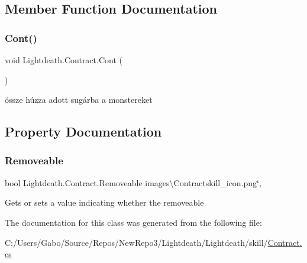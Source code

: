 \subsection{Member Function Documentation}
\hypertarget{class_lightdeath_1_1_contract_a87abee8cbc76b631f7a29c1adc583cc8}{}\label{class_lightdeath_1_1_contract_a87abee8cbc76b631f7a29c1adc583cc8} 
\subsubsection{\texorpdfstring{Cont()}{Cont()}}
{\footnotesize\ttfamily void Lightdeath.\+Contract.\+Cont (\begin{DoxyParamCaption}{ }\end{DoxyParamCaption})\hspace{0.3cm}{\ttfamily [inline]}}



össze húzza adott sugárba a monstereket 



\subsection{Property Documentation}
\hypertarget{class_lightdeath_1_1_contract_a90ab7d5a59e2086bd81c77e164d63ab5}{}\label{class_lightdeath_1_1_contract_a90ab7d5a59e2086bd81c77e164d63ab5} 
\subsubsection{\texorpdfstring{Removeable}{Removeable}}
{\footnotesize\ttfamily bool Lightdeath.\+Contract.\+Removeable images\textbackslash{}\+Contractskill\+\_\+icon.\+png\char`\"{}\hspace{0.3cm}{\ttfamily [get]}, {\ttfamily [set]}}



Gets or sets a value indicating whether the removeable 



The documentation for this class was generated from the following file\+:\begin{DoxyCompactItemize}
\item 
C\+:/\+Users/\+Gabo/\+Source/\+Repos/\+New\+Repo3/\+Lightdeath/\+Lightdeath/skill/\hyperlink{_contract_8cs}{Contract.\+cs}\end{DoxyCompactItemize}

